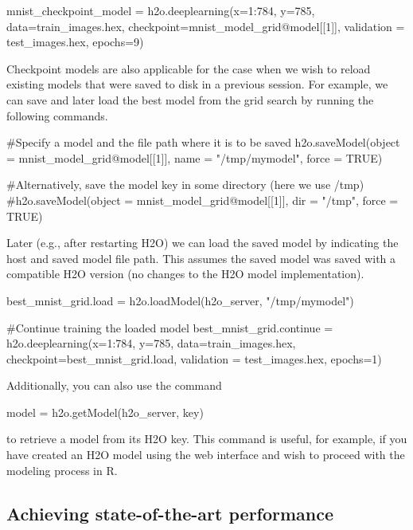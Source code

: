 \documentclass[11pt]{article}
\begin{document}
\begin{spverbatim}
mnist_checkpoint_model = h2o.deeplearning(x=1:784, y=785, data=train_images.hex, checkpoint=mnist_model_grid@model[[1]], validation = test_images.hex, epochs=9)

\end{spverbatim}
\noindent
Checkpoint models are also applicable for the case when we wish to reload existing models that were saved to disk in a previous session. For example, we can save and later load the best model from the grid search by running the following commands.

\begin{spverbatim}
#Specify a model and the file path where it is to be saved
h2o.saveModel(object = mnist_model_grid@model[[1]], name = "/tmp/mymodel", force = TRUE)

#Alternatively, save the model key in some directory (here we use /tmp)
#h2o.saveModel(object = mnist_model_grid@model[[1]], dir = "/tmp", force = TRUE)

\end{spverbatim}
\noindent
Later (e.g., after restarting  H2O) we can load the saved model by indicating the host and saved model file path. This assumes the saved model was saved with a compatible H2O version (no changes to the H2O model implementation).

\begin{spverbatim}
best_mnist_grid.load = h2o.loadModel(h2o_server, "/tmp/mymodel")

#Continue training the loaded model
best_mnist_grid.continue = h2o.deeplearning(x=1:784, y=785, data=train_images.hex, checkpoint=best_mnist_grid.load, validation = test_images.hex, epochs=1)

\end{spverbatim}
\noindent
Additionally, you can also use the command
\begin{spverbatim}
model = h2o.getModel(h2o_server, key)

\end{spverbatim}
\noindent
to retrieve a model from its H2O key. This command is useful, for example, if you have created an H2O model using the web interface and wish to proceed with the modeling process in R.

\subsection{Achieving state-of-the-art performance} \label{3.6}
\end{document}
